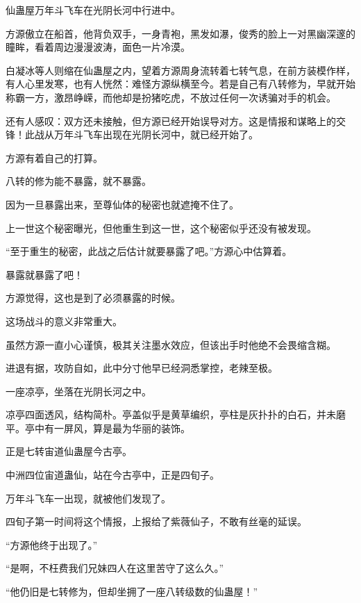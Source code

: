 
\begin{this_body}



仙蛊屋万年斗飞车在光阴长河中行进中。

方源傲立在船首，他背负双手，一身青袍，黑发如瀑，俊秀的脸上一对黑幽深邃的瞳眸，看着周边漫漫波涛，面色一片冷漠。

白凝冰等人则缩在仙蛊屋之内，望着方源周身流转着七转气息，在前方装模作样，有人心里发寒，也有人恍然：难怪方源纵横至今。若是自己有八转修为，早就开始称霸一方，激昂峥嵘，而他却是扮猪吃虎，不放过任何一次诱骗对手的机会。

还有人感叹：双方还未接触，但方源已经开始误导对方。这是情报和谋略上的交锋！此战从万年斗飞车出现在光阴长河中，就已经开始了。

方源有着自己的打算。

八转的修为能不暴露，就不暴露。

因为一旦暴露出来，至尊仙体的秘密也就遮掩不住了。

上一世这个秘密曝光，但他重生到这一世，这个秘密似乎还没有被发现。

“至于重生的秘密，此战之后估计就要暴露了吧。”方源心中估算着。

暴露就暴露了吧！

方源觉得，这也是到了必须暴露的时候。

这场战斗的意义非常重大。

虽然方源一直小心谨慎，极其关注墨水效应，但该出手时他绝不会畏缩含糊。

进退有据，攻防自如，此中分寸他早已经洞悉掌控，老辣至极。

一座凉亭，坐落在光阴长河之中。

凉亭四面透风，结构简朴。亭盖似乎是黄草编织，亭柱是灰扑扑的白石，并未磨平。亭中有一屏风，算是最为华丽的装饰。

正是七转宙道仙蛊屋今古亭。

中洲四位宙道蛊仙，站在今古亭中，正是四旬子。

万年斗飞车一出现，就被他们发现了。

四旬子第一时间将这个情报，上报给了紫薇仙子，不敢有丝毫的延误。

“方源他终于出现了。”

“是啊，不枉费我们兄妹四人在这里苦守了这么久。”

“他仍旧是七转修为，但却坐拥了一座八转级数的仙蛊屋！”


\end{this_body}
